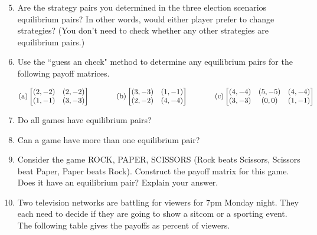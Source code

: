 \begin{enumerate}
\setcounter{enumi}{4}

\item Are the strategy pairs you determined in the three election scenarios equilibrium pairs? In other words, would either player prefer to change strategies? (You don't need to check whether any other strategies are equilibrium pairs.)

\vspace{.1in}

\item Use the ``guess an check" method to determine any equilibrium pairs for the following payoff matrices.


\begin{equation*}
{\rm(a)} \left[\begin{matrix}
(2,-2)&(2, -2)\\
(1, -1) & (3, -3)
\end{matrix}\right]\hspace{.5in}
{\rm(b)}\left[\begin{matrix}
(3,-3)&(1, -1)\\
(2, -2) & (4, -4)
\end{matrix}\right]\hspace{.5in}
{\rm(c)}\left[\begin{matrix}
(4,-4)&(5, -5)&(4, -4)\\
(3, -3) & (0, 0)&(1, -1)
\end{matrix}\right]
\end{equation*}

\vspace{.1in}
\item Do all games have equilibrium pairs?

\vspace{.1in}
\item Can a game have more than one equilibrium pair?

\vspace{.1in}
\item Consider the game ROCK, PAPER, SCISSORS (Rock beats Scissors, Scissors beat Paper, Paper beats Rock). Construct the payoff matrix for this game. Does it have an equilibrium pair? Explain your answer.

\item Two television networks are battling for viewers for 7pm Monday night. They each need to decide if they are going to show a sitcom or a sporting event. The following table gives the payoffs as percent of viewers.


\end{enumerate}
